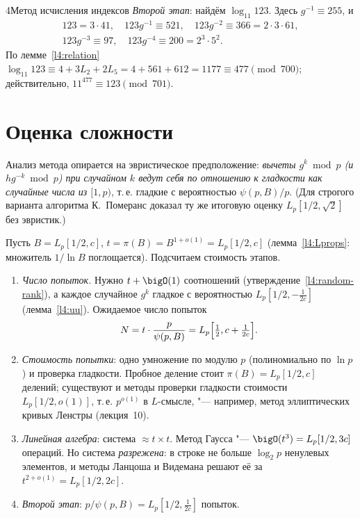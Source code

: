 \begin{lecture}{4}{Метод исчисления индексов}
\emph{Второй этап}: найдём $\log_{11} 123$. Здесь $g^{-1} \equiv 255$, и
\[
\begin{gathered}
  123 = 3 \cdot 41,\quad 123 g^{-1} \equiv 521,\quad 123 g^{-2} \equiv 366 = 2 \cdot 3 \cdot 61,\\
  123 g^{-3} \equiv 97,\quad 123 g^{-4} \equiv 200 = 2^3 \cdot 5^2.
\end{gathered}
\]
По лемме~\ref{l4:relation} $\log_{11} 123 \equiv 4 + 3 L_2 + 2 L_5 = 4 + 561 + 612 = 1177 \equiv 477
\pmod{700}$; действительно, $11^{477} \equiv 123 \pmod{701}$.




\section{Оценка сложности}

Анализ метода опирается на эвристическое предположение: \emph{вычеты $g^k \bmod p$ (и $h g^{-k}
\bmod p$) при случайном $k$ ведут себя по отношению к гладкости как случайные числа из
$[1, p)$}, т.\,е. гладкие с вероятностью $\psi(p, B)/p$. (Для строгого варианта алгоритма
К.~Померанс доказал ту же итоговую оценку $L_p[1/2, \sqrt 2]$ без эвристик.)

Пусть $B = L_p[1/2, c]$, $t = \pi(B) = B^{1 + o(1)} = L_p[1/2, c]$ (лемма~\ref{l4:Lprops}:
множитель $1/\ln B$ поглощается). Подсчитаем стоимость этапов.

\begin{enumerate}
  \item \emph{Число попыток.} Нужно $t + \bigO(1)$ соотношений
    (утверждение~\ref{l4:random-rank}), а каждое случайное $g^k$ гладкое с вероятностью
    $L_p[1/2, -\frac{1}{2c}]$ (лемма~\ref{l4:uu}). Ожидаемое число попыток
    \[
      N = t \cdot \frac{p}{\psi(p, B)} = L_p\Bigl[\tfrac12, c + \tfrac{1}{2c}\Bigr].
    \]
  \item \emph{Стоимость попытки}: одно умножение по модулю $p$ (полиномиально по $\ln p$) и
    проверка гладкости. Пробное деление стоит $\pi(B) = L_p[1/2, c]$ делений; существуют и
    методы проверки гладкости стоимости $L_p[1/2, o(1)]$, т.\,е. $p^{o(1)}$ в $L$-смысле, "---
    например, метод эллиптических кривых Ленстры (лекция~10).
  \item \emph{Линейная алгебра}: система $\approx t \times t$. Метод Гаусса "--- $\bigO(t^3)
    = L_p[1/2, 3c]$ операций. Но система \emph{разрежена}: в строке не больше $\log_2 p$
    ненулевых элементов, и методы Ланцоша и Видемана решают её за $t^{2 + o(1)} = L_p[1/2, 2c]$.
  \item \emph{Второй этап}: $p/\psi(p, B) = L_p[1/2, \frac{1}{2c}]$ попыток.
\end{enumerate}


\end{lecture}

